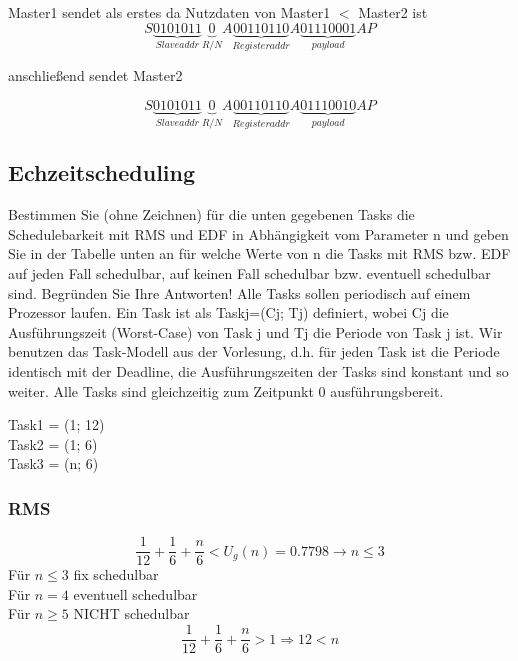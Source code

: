 Master1 sendet als erstes da Nutzdaten von Master1 $<$ Master2 ist
\begin{equation}
  S\underbrace{0101011}_{Slave addr}\underbrace{0}_{R/N}A\underbrace{00110110}_{Register addr}A\underbrace{01110001}_{payload}AP
\end{equation}

anschließend sendet Master2

\begin{equation}
  S\underbrace{0101011}_{Slave addr}\underbrace{0}_{R/N}A\underbrace{00110110}_{Register addr}A\underbrace{01110010}_{payload}AP
\end{equation}


\subsection{Echzeitscheduling}
Bestimmen Sie (ohne Zeichnen) für die unten gegebenen Tasks die Schedulebarkeit mit RMS und EDF in Abhängigkeit vom 
Parameter n und geben Sie in der Tabelle unten an für welche Werte von n die Tasks mit RMS bzw. EDF auf jeden Fall 
schedulbar, auf keinen Fall schedulbar bzw. eventuell schedulbar sind. 
Begründen Sie Ihre Antworten! Alle Tasks sollen periodisch auf einem Prozessor laufen. Ein Task ist als Taskj=(Cj; Tj) 
definiert, wobei Cj die Ausführungszeit (Worst-Case) von Task j und Tj die Periode von Task j ist. Wir benutzen das 
Task-Modell aus der Vorlesung, d.h. für jeden Task ist die Periode identisch mit der Deadline, die Ausführungszeiten 
der Tasks sind konstant und so weiter. Alle Tasks sind gleichzeitig zum Zeitpunkt 0 ausführungsbereit. 

Task1 = (1; 12)\\
Task2 = (1; 6)\\
Task3 = (n; 6)\\

\subsubsection{RMS}
\begin{equation}
  \frac{1}{12} + \frac{1}{6} + \frac{n}{6} < U_g(n) = 0.7798 \rightarrow n \leq 3
\end{equation}
Für $n \leq 3$ fix schedulbar\\
Für $n = 4$ eventuell schedulbar\\
Für $n \geq 5$ NICHT schedulbar
\begin{equation}
  \frac{1}{12} + \frac{1}{6} + \frac{n}{6} > 1 \Rightarrow 12 < n
\end{equation}

